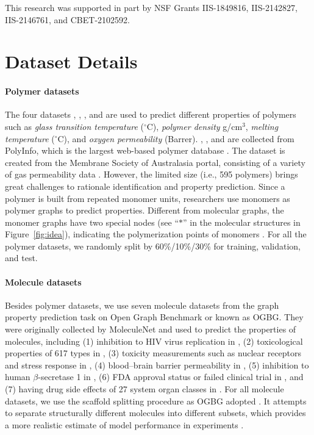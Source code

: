 \documentclass[sigconf]{acmart}
\begin{document}
\begin{acks}
This research was supported in part by NSF Grants IIS-1849816, IIS-2142827, IIS-2146761, and CBET-2102592.
\end{acks}

\balance



\clearpage
\appendix
\section{Dataset Details}
\label{sec:dataset_details}
\vspace{-0.05in}
\paragraph{Polymer datasets} The four datasets \glassTemp, \meltTemp, \density, and \oxygen are used to predict different properties of polymers such as \emph{glass transition temperature} ($^\circ$C), \emph{polymer density} g/cm$^3$, \emph{melting temperature} ($^\circ$C), and \emph{oxygen permeability} (Barrer). \glassTemp, \meltTemp, and \density are collected from PolyInfo, which is the largest web-based polymer database \cite{otsuka2011polyinfo}. The \oxygen dataset is created from the Membrane Society of Australasia portal,
consisting of a variety of gas permeability data \cite{thornton2012polymer}. However, the limited size (i.e., 595 polymers) brings great challenges to rationale identification and property prediction. Since a polymer is built from repeated monomer units, researchers use monomers as polymer graphs to predict properties. Different from molecular graphs, the monomer graphs have two special nodes (see ``$*$'' in the molecular structures in Figure~\ref{fig:idea}), indicating the polymerization points of monomers \cite{ma2020pi1m}. For all the polymer datasets, we randomly split by 60\%/10\%/30\% for training, validation, and test.

\vspace{-0.05in}
\paragraph{Molecule datasets} Besides polymer datasets, we use seven molecule datasets from the graph property prediction task on Open Graph Benchmark or known as OGBG. They were originally collected by MoleculeNet \cite{wu2018moleculenet} and used to predict the properties of molecules, including (1) inhibition to HIV virus replication in \hiv, (2) toxicological properties of 617 types in \toxcast, (3) toxicity measurements such as nuclear receptors and stress response in \toxt, (4) blood–brain barrier permeability in \bbbp, (5) inhibition to human $\beta$-secretase 1 in \bace, (6) FDA approval status or failed clinical trial in \clintox, and (7) having drug side effects of 27 system organ classes in \sider. For all molecule datasets, we use the scaffold splitting procedure as OGBG adopted \cite{hu2020open}. It attempts to separate structurally different molecules into different subsets, which provides a more realistic estimate of model performance in experiments \cite{wu2018moleculenet}.
\end{document}
